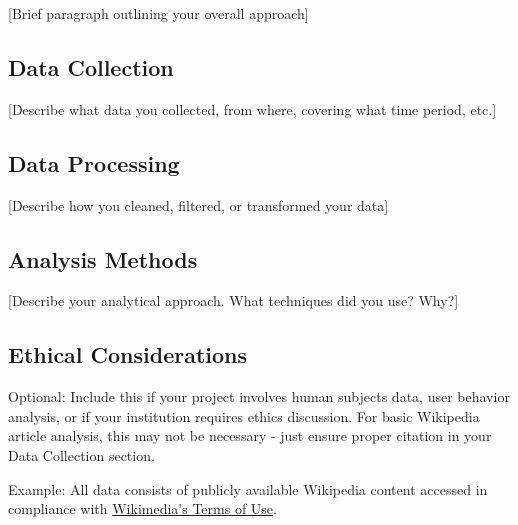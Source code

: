 
\label{sec:methodology}

[Brief paragraph outlining your overall approach]

\subsection{Data Collection}

[Describe what data you collected, from where, covering what time period, etc.]


\subsection{Data Processing}

[Describe how you cleaned, filtered, or transformed your data]


\subsection{Analysis Methods}

[Describe your analytical approach. What techniques did you use? Why?]


\subsection{Ethical Considerations}
Optional: Include this if your project involves human subjects data, user behavior analysis, or if your institution requires ethics discussion. For basic Wikipedia article analysis, this may not be necessary - just ensure proper citation in your Data Collection section.

Example: All data consists of publicly available Wikipedia content accessed in compliance with \href{https://foundation.wikimedia.org/wiki/Policy:Terms_of_Use}{Wikimedia's Terms of Use}.

